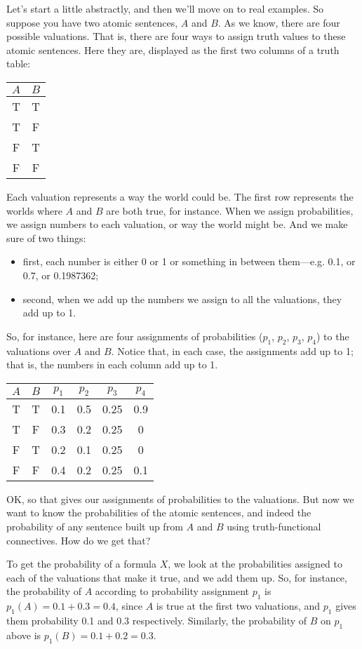 Let's start a little abstractly, and then we'll move on to real examples. So suppose you have two atomic sentences, $A$ and $B$. As we know, there are four possible valuations. That is, there are four ways to assign truth values to these atomic sentences. Here they are, displayed as the first two columns of a truth table:
\begin{center}
\begin{tabular}{cc}
$A$ & $B$ \\
\hline
T & T \\
T & F \\
F & T \\
F & F
\end{tabular}
\end{center}
Each valuation represents a way the world could be. The first row represents the worlds where $A$ and $B$ are both true, for instance. When we assign probabilities, we assign numbers to each valuation, or way the world might be. And we make sure of two things:
\begin{itemize}
\item first, each number is either 0 or 1 or something in between them---e.g. 0.1, or 0.7, or 0.1987362;
\item second, when we add up the numbers we assign to all the valuations, they add up to 1.
\end{itemize}
So, for instance, here are four assignments of probabilities ($p_1$, $p_2$, $p_3$, $p_4$) to the valuations over $A$ and $B$. Notice that, in each case, the assignments  add up to 1; that is, the numbers in each column add up to 1.
\begin{center}
\begin{tabular}{cc|c|c|c|c}
$A$ & $B$ & $p_1$ & $p_2$ & $p_3$ & $p_4$\\
\hline
T & T & 0.1 & 0.5 & 0.25 & 0.9\\
T & F & 0.3 & 0.2 & 0.25 & 0 \\
F & T & 0.2 & 0.1 & 0.25 & 0 \\
F & F & 0.4 & 0.2 & 0.25 & 0.1 
\end{tabular}
\end{center}
OK, so that gives our assignments of probabilities to the valuations. But now we want to know the probabilities of the atomic sentences, and indeed the probability of any sentence built up from $A$ and $B$ using truth-functional connectives. How do we get that?

To get the probability of a formula $X$, we look at the probabilities assigned to each of the valuations that make it true, and we add them up. So, for instance, the probability of $A$ according to probability assignment $p_1$ is $p_1(A) = 0.1 + 0.3 = 0.4$, since $A$ is true at the first two valuations, and $p_1$ gives them probability 0.1 and 0.3 respectively. Similarly, the probability of $B$ on $p_1$ above is $p_1(B) = 0.1 + 0.2 = 0.3$.

